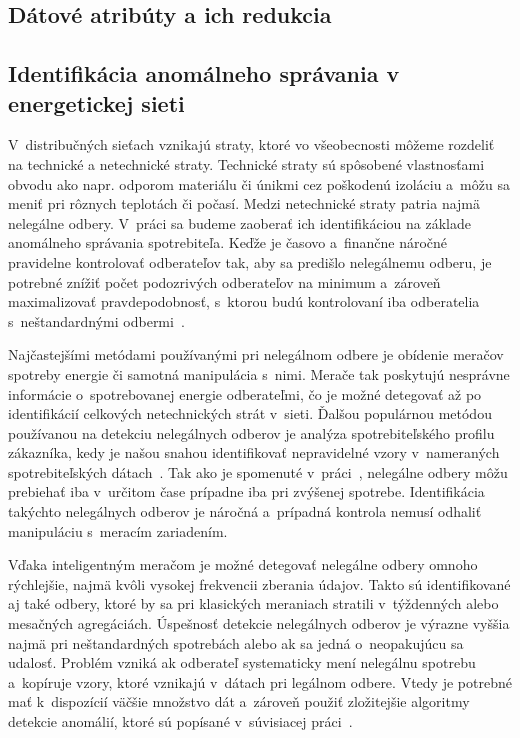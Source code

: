 \documentclass[a4paper,twoside,slovak,12pt]{article}
\begin{document}

\subsection{Dátové atribúty a ich redukcia}


\subsection{Identifikácia anomálneho správania v energetickej sieti}
V~distribučných sieťach vznikajú straty, ktoré vo všeobecnosti môžeme rozdeliť
na technické a netechnické straty. Technické straty sú spôsobené vlastnosťami
obvodu ako napr. odporom materiálu či únikmi cez poškodenú izoláciu a~môžu sa
meniť pri rôznych teplotách či počasí. Medzi netechnické straty patria najmä
nelegálne odbery. V~práci sa budeme zaoberať ich identifikáciou na základe
anomálneho správania spotrebiteľa. Keďže je časovo a~finančne náročné
pravidelne kontrolovať odberateľov tak, aby sa predišlo nelegálnemu odberu,
je potrebné znížiť počet podozrivých odberateľov na minimum a~zároveň
maximalizovať pravdepodobnosť, s~ktorou budú kontrolovaní iba odberatelia
s~neštandardnými odbermi~\cite{Coma-Puig2016,Sahoo2015}.

Najčastejšími metódami používanými pri nelegálnom odbere je obídenie meračov
spotreby energie či samotná manipulácia s~nimi. Merače tak poskytujú nesprávne
informácie o~spotrebovanej energie odberateľmi, čo je možné detegovať až po
identifikácií celkových netechnických strát v~sieti. Ďalšou populárnou metódou
používanou na detekciu nelegálnych odberov je analýza spotrebiteľského
profilu zákazníka, kedy je našou snahou identifikovať nepravidelné vzory
v~nameraných spotrebiteľských dátach~\cite{Sahoo2015}. Tak ako je spomenuté
v~práci~\cite{Depuru2012}, nelegálne odbery môžu prebiehať iba v~určitom čase
prípadne iba pri zvýšenej spotrebe. Identifikácia takýchto nelegálnych odberov
je náročná a~prípadná kontrola nemusí odhaliť manipuláciu s~meracím zariadením.

Vďaka inteligentným meračom je možné detegovať nelegálne odbery omnoho
rýchlejšie, najmä kvôli vysokej frekvencii zberania údajov. Takto sú
identifikované aj také odbery, ktoré by sa pri klasických meraniach stratili
v~týždenných alebo mesačných agregáciách. Úspešnosť detekcie nelegálnych odberov
je výrazne vyššia najmä pri neštandardných spotrebách alebo ak sa jedná
o~neopakujúcu sa udalosť. Problém vzniká ak odberateľ systematicky mení
nelegálnu spotrebu a~kopíruje vzory, ktoré vznikajú v~dátach pri legálnom
odbere. Vtedy je potrebné mať k~dispozícií väčšie množstvo dát a~zároveň použiť
zložitejšie algoritmy detekcie anomálií, ktoré sú popísané v~súvisiacej
práci~\cite{Nikovski2013}.
\end{document}
